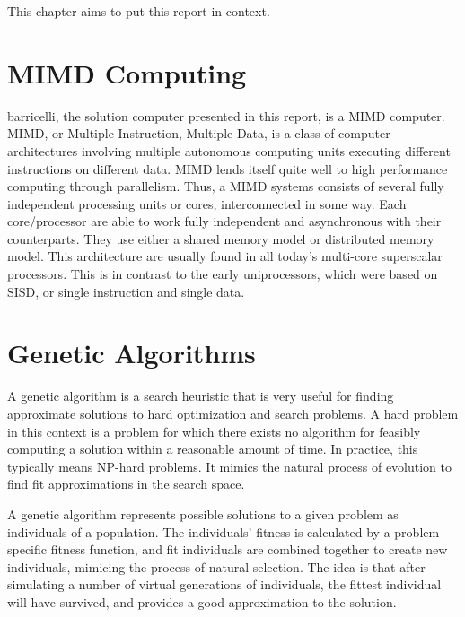 This chapter aims to put this report in context.

\section{MIMD Computing}

\Gls{barricelli}, the solution computer presented in this report, is a \Gls{MIMD} computer. \Gls{MIMD}, or Multiple Instruction, Multiple Data, is a class of computer architectures involving multiple autonomous computing units executing different instructions on different data.
MIMD lends itself quite well to high performance computing through parallelism. Thus, a MIMD systems consists of several fully independent processing units or cores, interconnected in some way. Each core/processor are able to work fully independent and asynchronous with their counterparts. They use either a shared memory model or distributed memory model. This architecture are usually found in all today’s multi-core superscalar processors. This is in contrast to the early uniprocessors, which were based on SISD, or single instruction and single data. 







\section{Genetic Algorithms}

A genetic algorithm is a search heuristic that is very useful for finding approximate solutions to hard optimization and search problems.
A hard problem in this context is a problem for which there exists no algorithm for feasibly computing a solution within a reasonable amount of time.
In practice, this typically means NP-hard problems.
It mimics the natural process of evolution to find fit approximations in the search space.

A genetic algorithm represents possible solutions to a given problem as individuals of a population.
The individuals' fitness is calculated by a problem-specific fitness function, and fit individuals are combined together to create new individuals, mimicing the process of natural selection.
The idea is that after simulating a number of virtual generations of individuals, the fittest individual will have survived, and provides a good approximation to the solution.

